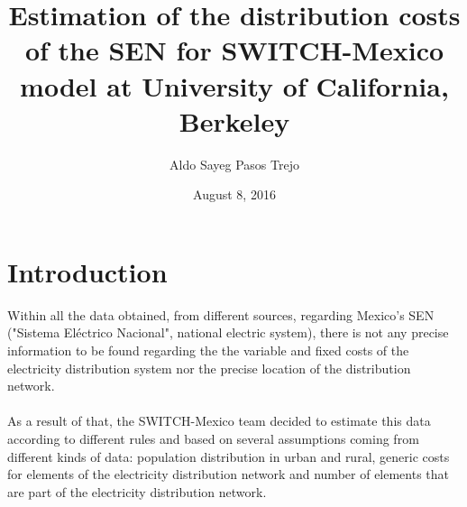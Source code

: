 \documentclass[•]{article}
\author{Aldo Sayeg Pasos Trejo}
\date{August 8, 2016}
\title{Estimation of the distribution costs of the SEN for SWITCH-Mexico model at University of California, Berkeley}
\begin{document}
\maketitle
\section{Introduction}
Within all the data obtained, from different sources, regarding Mexico's SEN ("Sistema Eléctrico Nacional", national electric system), there is not any precise information to be found regarding the the variable and fixed costs of the electricity distribution system nor the precise location of the distribution network.
\\
\\As a result of that, the SWITCH-Mexico team decided to estimate this data according to different rules and based on several assumptions coming from different kinds of data: population distribution in urban and rural, generic costs for elements of the electricity distribution network and number of elements that are part of the electricity distribution network.
\end{document}
